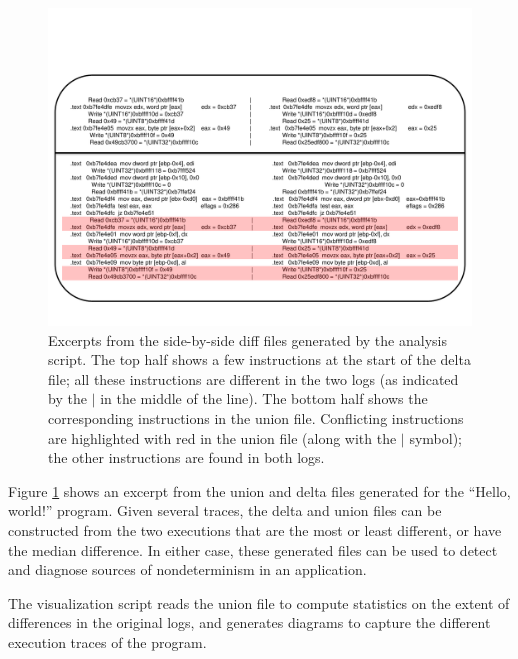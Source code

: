 \begin{figure}[h]
  \center
  \includegraphics[scale=0.55, trim=2cm 1cm 2cm 1cm]{log2.pdf}
  \caption[Excerpts from the side-by-side diff files generated by the analysis script]%
          {Excerpts from the side-by-side diff files generated by the analysis script.
            The top half shows a few instructions at the start of the delta file;
            all these instructions are different in the two logs (as
            indicated by the $\vert$ in the middle of the line).
            The bottom half shows the corresponding instructions in the union file.
            Conflicting instructions are highlighted with red in the 
            union file (along with the $\vert$ symbol); the other instructions are found in both logs.}
  \label{hw:logsys2}
\end{figure}

Figure \ref{hw:logsys2} shows an excerpt from the 
union and delta files generated for the ``Hello, world!''
program. Given several traces, the delta and union
files can be constructed from the two
executions that are the most or least different, 
or have the median difference. In either case, these generated files can be used to
detect and diagnose sources of nondeterminism
in an application. \newline

 \newline
The visualization script reads the union file to 
compute statistics on the extent of differences in the
original logs, and generates diagrams to 
capture the different execution traces of the program.
 
